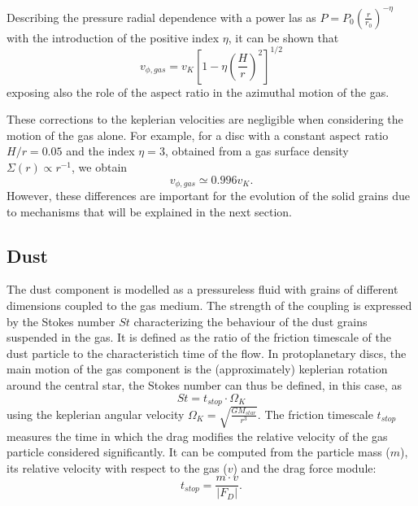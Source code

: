 \documentclass[a4paper,10pt]{report}
\begin{document}
Describing the pressure radial dependence with a power las as 
$P = P_0 \left(\frac{r}{r_0}\right)^{-\eta}$ with the introduction of 
the positive index $\eta$, it can be shown that 
\begin{equation}
    v_{\phi, gas} = v_K \left[ 1 - \eta \left(\frac{H}{r} \right)^2 \right] ^{1/2}
\end{equation}
exposing also the role of the aspect ratio
in the azimuthal motion of the gas.

These corrections to the keplerian velocities are negligible when considering the motion of the gas alone.
For example, for a disc with a constant aspect ratio $H/r = 0.05$ and the index $\eta = 3$, obtained from 
a gas surface density $\Sigma(r) \propto r^{-1}$, we obtain
\begin{equation}
    v_{\phi,gas} \simeq 0.996v_K.
\end{equation}
However, these differences are important for the evolution
of the solid grains due to mechanisms that will be explained in the next section.
\subsection{Dust}

The dust component is modelled as a pressureless fluid with grains of different dimensions coupled to the gas medium. 
The strength of the coupling is expressed by the Stokes number $St$ characterizing the behaviour of
the dust grains suspended in the gas.
It is defined as the ratio of the friction timescale of the dust particle to the characteristich time of the flow.
In protoplanetary discs, the main motion of the gas component is the (approximately)
keplerian rotation around the central star, the Stokes number can thus be defined, in this case,
as 
\begin{equation}
    St = t_{stop} \cdot \Omega_K
\end{equation}
using the keplerian angular velocity $\Omega_K = \sqrt{\frac{GM_{star}}{r^3}}$.
The friction timescale $t_{stop}$ measures the time in which the drag modifies the relative velocity of the 
gas particle considered significantly. It can be computed from the particle mass ($m$), 
its relative velocity with respect to the gas ($v$)
and the drag force module:
\begin{equation}
    t_{stop} = \frac{m\cdot v}{|F_D|}.
\end{equation}
\end{document}
